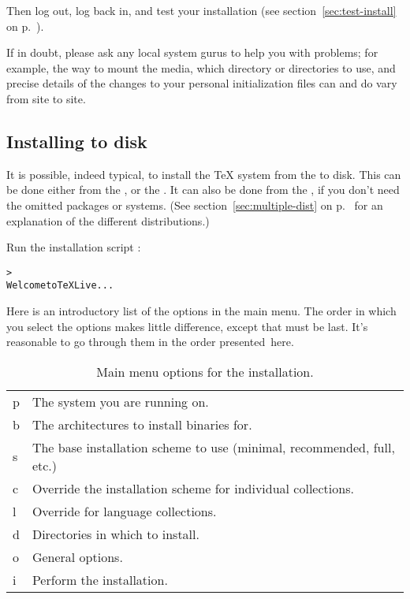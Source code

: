 \documentclass{article}
\begin{document}
\def\donewithinst{%
\noindent Then log out, log back in, and test your installation
(see section~\ref{sec:test-install} on p.~\pageref{sec:test-install}).
}
\donewithinst

\def\ifindoubt{%
If in doubt, please ask any local system gurus to help you with
problems; for example, the way to mount the \TeXLive{} media, which
directory or directories to use, and precise details of the changes to
your personal initialization files can and do vary from site to site.
}
\ifindoubt


% 
\subsection{Installing \protect\TeXLive{} to disk}
\label{sec:unix-install-disk}

It is possible, indeed typical, to install the \TeX{} system from the
\TeXLive{} to disk.  This can be done either from the 
\DVD, or the  \CD.  It can also be done from the
 \CD, if you don't need the omitted packages or systems.
(See section~\ref{sec:multiple-dist} on p.~\pageref{sec:multiple-dist}
for an explanation of the different distributions.)

\startinst

Run the installation script :
\begin{alltt}
> 
Welcome to TeX Live...
\end{alltt}

\firstinstcommand

Here is an introductory list of the options in the main menu.  The order
in which you select the options makes little difference, except that
 must be last.  It's reasonable to go through them in the
order presented~here.

\begin{table}[H]
\caption{Main menu options for the installation.}
\label{tab:main-menu-options}
\begin{tabular}{>{\ttfamily}ll}
p & The system you are running on.\\
b & The architectures to install binaries for.\\
s & The base installation scheme to use (minimal, recommended,
          full, etc.)\\
c & Override the installation scheme for individual collections.\\
l & Override for language collections.\\
d & Directories in which to install.\\
o & General options.\\
i & Perform the installation.\\
\end{tabular}
\end{table}
\end{document}
